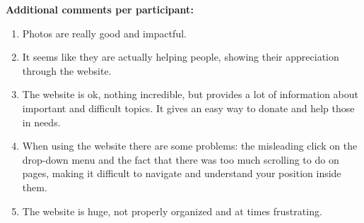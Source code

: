 \vspace{0.25cm}

\textbf{Additional comments per participant:}
\begin{enumerate}
	\item Photos are really good and impactful.
	\item It seems like they are actually helping people, showing their appreciation through the website.
	\item The website is ok, nothing incredible, but provides a lot of information about important and difficult topics. It gives an easy way to donate and help those in needs.
	\item When using the website there are some problems: the misleading click on the drop-down menu and the fact that there was too much scrolling to do on pages, making it difficult to navigate and understand your position inside them.
	\item The website is huge, not properly organized and at times frustrating.
\end{enumerate}